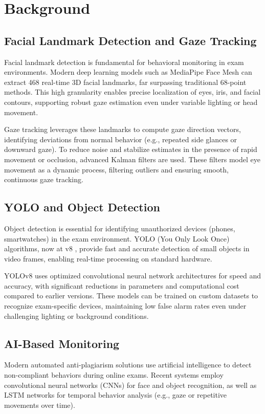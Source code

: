 \documentclass[conference]{IEEEtran}
\begin{document}
\section{Background}

\subsection{Facial Landmark Detection and Gaze Tracking}
Facial landmark detection is fundamental for behavioral monitoring in exam environments. Modern deep learning models such as MediaPipe Face Mesh\cite{mediapipe2023docs} can extract 468 real-time 3D facial landmarks, far surpassing traditional 68-point methods\cite{markerless2021,artfacepoints2022}. This high granularity enables precise localization of eyes, iris, and facial contours, supporting robust gaze estimation even under variable lighting or head movement.

Gaze tracking leverages these landmarks to compute gaze direction vectors, identifying deviations from normal behavior (e.g., repeated side glances or downward gaze). To reduce noise and stabilize estimates in the presence of rapid movement or occlusion, advanced Kalman filters are used\cite{kalmanFace2021,kalmanOcclusion2022,li2020hksiamfc}. These filters model eye movement as a dynamic process, filtering outliers and ensuring smooth, continuous gaze tracking.

\subsection{YOLO and Object Detection}
Object detection is essential for identifying unauthorized devices (phones, smartwatches) in the exam environment. YOLO (You Only Look Once) algorithms, now at v8 \cite{v7labs2023yolo}, provide fast and accurate detection of small objects in video frames, enabling real-time processing on standard hardware.

YOLOv8 uses optimized convolutional neural network architectures for speed and accuracy, with significant reductions in parameters and computational cost compared to earlier versions. These models can be trained on custom datasets to recognize exam-specific devices, maintaining low false alarm rates even under challenging lighting or background conditions.

\subsection{AI-Based Monitoring}
Modern automated anti-plagiarism solutions use artificial intelligence to detect non-compliant behaviors during online exams. Recent systems\cite{kaddoura2022,abbas2022review,alsabhan2023,nigam2021,ahmad2021} employ convolutional neural networks (CNNs) for face and object recognition, as well as LSTM networks for temporal behavior analysis (e.g., gaze or repetitive movements over time).
\end{document}
